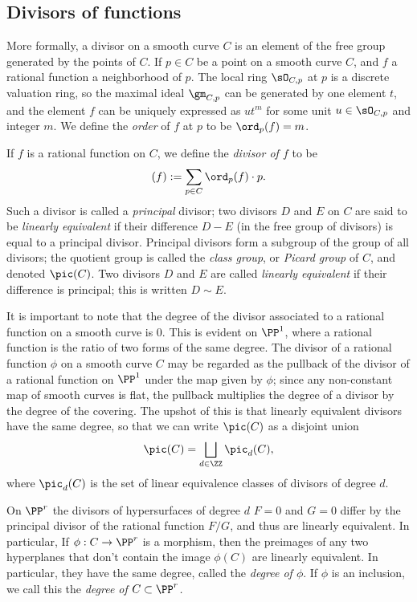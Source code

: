 \subsection{Divisors of functions}

More formally, a divisor on a smooth curve $C$ is an element of the free group generated by the points of $C$. If $p \in C$ be a point on a smooth curve $C$, and $f$ a rational function a neighborhood of $p$. 
The local ring $\sO_{C,p}$ at $p$ is a discrete valuation ring, so the maximal ideal $\gm_{C,p}$ can be generated by one element $t$,
and the element $f$ can be uniquely expressed as $ut^m$ for some unit $u\in \sO_{C,p}$ and integer $m$.  We define the \emph{order} of $f$ at $p$ to be $\ord_p(f) = m$. 

If $f$ is a rational function on $C$, we  define the \emph{divisor of $f$} to be
$$
(f) := \sum_{p \in C} \ord_p(f) \cdot p.
$$
Such a divisor is called a \emph{principal} divisor; two divisors $D$ and $E$ on $C$ are said to be \emph{linearly equivalent} if their difference $D-E$ (in the free group of divisors) is equal to a principal divisor. Principal divisors form a subgroup of the group of all divisors; the quotient group is called the \emph{class group}, or \emph{Picard group} of $C$, and denoted $\pic(C)$. Two divisors $D$ and $E$ are called \emph{linearly equivalent} if their difference is principal; this is written $D \sim E$.

It is important to note that the degree of the divisor associated to a rational function on a smooth curve is 0. This is evident on $\PP^1$, where a rational 
function is the ratio of two forms of the same degree. The divisor of a rational function $\phi$ on a smooth curve $C$ may be regarded as the pullback of the divisor of a rational function
on $\PP^1$ under the map given by $\phi$; since any non-constant map of smooth curves is flat, the pullback multiplies the degree of a divisor by the degree 
of the covering. The upshot of this is that linearly equivalent divisors have the same degree, so that we can write $\pic(C)$ as a disjoint union
$$
\pic(C) = \bigsqcup_{d \in \ZZ} \pic_d(C),
$$
where $\pic_d(C)$ is the set of linear equivalence classes of divisors of degree $d$.

On $\PP^r$ the divisors of hypersurfaces of degree $d$ $F = 0$ and $G=0$ differ by the principal divisor of the rational function $F/G$,
and thus are linearly equivalent. In particular, If $\phi : C \to \PP^r$ is a morphism, then the preimages
of any two hyperplanes that don't contain the image $\phi(C)$ are linearly equivalent. In particular, they have the same
degree, called the \emph{degree of $\phi$}. If $\phi$ is an inclusion, we call this the \emph{degree of $C\subset \PP^r$.}

